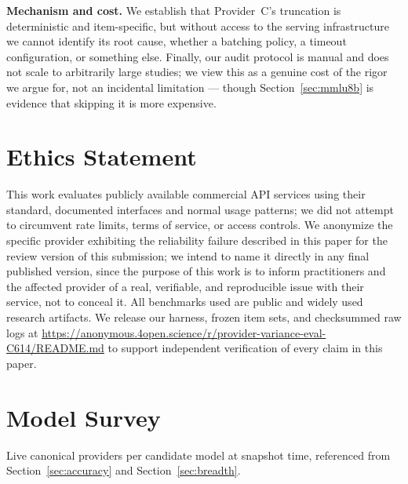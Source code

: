 \documentclass[11pt]{article}
\begin{document}
\textbf{Mechanism and cost.} We establish that Provider~C's truncation
is deterministic and item-specific, but without access to the serving
infrastructure we cannot identify its root cause, whether a batching
policy, a timeout configuration, or something else. Finally, our audit
protocol is manual and does not scale to arbitrarily large studies; we
view this as a genuine cost of the rigor we argue for, not an
incidental limitation --- though Section~\ref{sec:mmlu8b} is evidence
that skipping it is more expensive.

\section*{Ethics Statement}

This work evaluates publicly available commercial API services using
their standard, documented interfaces and normal usage patterns; we
did not attempt to circumvent rate limits, terms of service, or access
controls. We anonymize the specific provider exhibiting the reliability
failure described in this paper for the review version of this
submission; we intend to name it directly in any final published
version, since the purpose of this work is to inform practitioners and
the affected provider of a real, verifiable, and reproducible issue
with their service, not to conceal it. All benchmarks used are public
and widely used research artifacts. We release our harness, frozen
item sets, and checksummed raw logs at
\url{https://anonymous.4open.science/r/provider-variance-eval-C614/README.md}
to support independent verification of every claim in this paper.



\appendix

\section{Model Survey}
\label{app:models}

Live canonical providers per candidate model at snapshot time, referenced
from Section~\ref{sec:accuracy} and Section~\ref{sec:breadth}.
\end{document}

